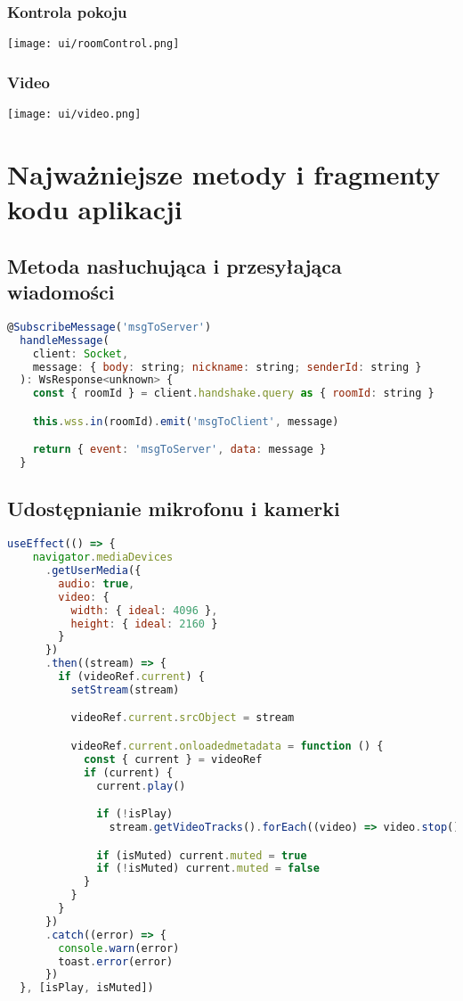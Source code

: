\documentclass{article}
\begin{document}
\subsubsection{Kontrola pokoju}
\texttt{[image: ui/roomControl.png]}

\subsubsection{Video}
\texttt{[image: ui/video.png]}

\section{Najważniejsze metody i fragmenty kodu aplikacji}

\subsection{Metoda nasłuchująca i przesyłająca wiadomości}
\begin{lstlisting}[language=JavaScript]
  @SubscribeMessage('msgToServer')
  handleMessage(
    client: Socket,
    message: { body: string; nickname: string; senderId: string }
  ): WsResponse<unknown> {
    const { roomId } = client.handshake.query as { roomId: string }

    this.wss.in(roomId).emit('msgToClient', message)

    return { event: 'msgToServer', data: message }
  }
\end{lstlisting}

\subsection{Udostępnianie mikrofonu i kamerki}
\begin{lstlisting}[language=JavaScript]
  useEffect(() => {
    navigator.mediaDevices
      .getUserMedia({
        audio: true,
        video: {
          width: { ideal: 4096 },
          height: { ideal: 2160 }
        }
      })
      .then((stream) => {
        if (videoRef.current) {
          setStream(stream)

          videoRef.current.srcObject = stream

          videoRef.current.onloadedmetadata = function () {
            const { current } = videoRef
            if (current) {
              current.play()

              if (!isPlay)
                stream.getVideoTracks().forEach((video) => video.stop())

              if (isMuted) current.muted = true
              if (!isMuted) current.muted = false
            }
          }
        }
      })
      .catch((error) => {
        console.warn(error)
        toast.error(error)
      })
  }, [isPlay, isMuted])
\end{lstlisting}
\end{document}
